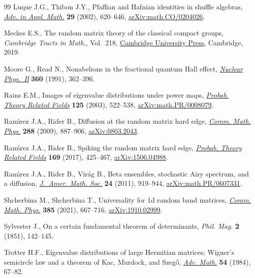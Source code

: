 \documentclass[pdftex]{sigma}
\numberwithin{equation}{section}
\theoremstyle{definition}
\begin{document}
\begin{thebibliography}{99}
Luque J.G., Thibon J.Y., Pfaffian and {H}afnian identities in shuffle algebras,
 \href{https://doi.org/10.1016/S0196-8858(02)00036-2}{\textit{Adv. in Appl.
 Math.}} \textbf{29} (2002), 620--646,
 \href{http://arxiv.org/abs/math.CO/0204026}{arXiv:math.CO/0204026}.

Meckes E.S., The random matrix theory of the classical compact groups,
 \textit{Cambridge Tracts in Math.}, Vol.~218,
 \href{https://doi.org/10.1017/9781108303453.009}{Cambridge University Press},
 Cambridge, 2019.

Moore G., Read N., Nonabelions in the fractional quantum {H}all effect,
 \href{https://doi.org/10.1016/0550-3213(91)90407-O}{\textit{Nuclear Phys.~B}}
 \textbf{360} (1991), 362--396.

Rains E.M., Images of eigenvalue distributions under power maps,
 \href{https://doi.org/10.1007/s00440-002-0250-2}{\textit{Probab. Theory
 Related Fields}} \textbf{125} (2003), 522--538,
 \href{http://arxiv.org/abs/math.PR/0008079}{arXiv:math.PR/0008079}.

Ram\'{\i}rez J.A., Rider B., Diffusion at the random matrix hard edge,
 \href{https://doi.org/10.1007/s00220-008-0712-1}{\textit{Comm. Math. Phys.}}
 \textbf{288} (2009), 887--906,
 \href{http://arxiv.org/abs/0803.2043}{arXiv:0803.2043}.

Ram\'{\i}rez J.A., Rider B., Spiking the random matrix hard edge,
 \href{https://doi.org/10.1007/s00440-016-0733-1}{\textit{Probab. Theory
 Related Fields}} \textbf{169} (2017), 425--467,
 \href{http://arxiv.org/abs/1506.04988}{arXiv:1506.04988}.

Ram\'{\i}rez J.A., Rider B., Vir\'ag B., Beta ensembles, stochastic {A}iry
 spectrum, and a diffusion,
 \href{https://doi.org/10.1090/S0894-0347-2011-00703-0}{\textit{J.~Amer. Math.
 Soc.}} \textbf{24} (2011), 919--944,
 \href{http://arxiv.org/abs/math.PR/0607331}{arXiv:math.PR/0607331}.

Shcherbina M., Shcherbina T., Universality for 1d random band matrices,
 \href{https://doi.org/10.1007/s00220-021-04135-6}{\textit{Comm. Math. Phys.}}
 \textbf{385} (2021), 667--716,
 \href{http://arxiv.org/abs/1910.02999}{arXiv:1910.02999}.

Sylvester J., On a certain fundamental theorem of determinants, \textit{Phil.
 Mag.} \textbf{2} (1851), 142--145.

Trotter H.F., Eigenvalue distributions of large {H}ermitian matrices;
 {W}igner's semicircle law and a theorem of {K}ac, {M}urdock, and {S}zeg\H{o},
 \href{https://doi.org/10.1016/0001-8708(84)90037-9}{\textit{Adv. Math.}}
 \textbf{54} (1984), 67--82.


\end{thebibliography}
\end{document}

